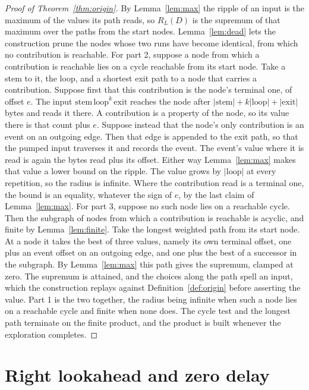 \documentclass[11pt,a4paper]{article}
\theoremstyle{definition}
\theoremstyle{plain}
\newcommand{\ripple}{R_{L}}
\begin{document}
\begin{proof}[Proof of Theorem~\ref{thm:origin}]
By Lemma~\ref{lem:max} the ripple of an input is the maximum of the values its path reads, so \(\ripple(D)\) is the
supremum of that maximum over the paths from the start nodes. Lemma~\ref{lem:dead} lets the construction prune the nodes
whose two runs have become identical, from which no contribution is reachable. For part 2, suppose a node from which a
contribution is reachable lies on a cycle reachable from its start node. Take a stem to it, the loop, and a shortest
exit path to a node that carries a contribution. Suppose first that this contribution is the node's terminal one, of
offset \(e\). The input \(\mathrm{stem}\,\mathrm{loop}^k\,\mathrm{exit}\) reaches the node after
\(|\mathrm{stem}| + k|\mathrm{loop}| + |\mathrm{exit}|\) bytes and reads it there. A contribution is a property of the
node, so its value there is that count plus \(e\). Suppose instead that the node's only contribution is an event on an
outgoing edge. Then that edge is appended to the exit path, so that the pumped input traverses it and records the event.
The event's value where it is read is again the bytes read plus its offset. Either way Lemma~\ref{lem:max} makes that
value a lower bound on the ripple. The value grows by \(|\mathrm{loop}|\) at every repetition, so the radius is
infinite. Where the contribution read is a terminal one, the bound is an equality, whatever the sign of \(e\), by the
last claim of Lemma~\ref{lem:max}. For part 3, suppose no such node lies on a reachable cycle. Then the subgraph of
nodes from which a contribution is reachable is acyclic, and finite by Lemma~\ref{lem:finite}. Take the longest weighted
path from its start node. At a node it takes the best of three values, namely its own terminal offset, one plus an event
offset on an outgoing edge, and one plus the best of a successor in the subgraph. By Lemma~\ref{lem:max} this path gives
the supremum, clamped at zero. The supremum is attained, and the choices along the path spell an input, which the
construction replays against Definition~\ref{def:origin} before asserting the value. Part 1 is the two together, the
radius being infinite when such a node lies on a reachable cycle and finite when none does. The cycle test and the
longest path terminate on the finite product, and the product is built whenever the exploration completes.
\end{proof}

\section{Right lookahead and zero delay}\label{app:lookahead}
\end{document}
